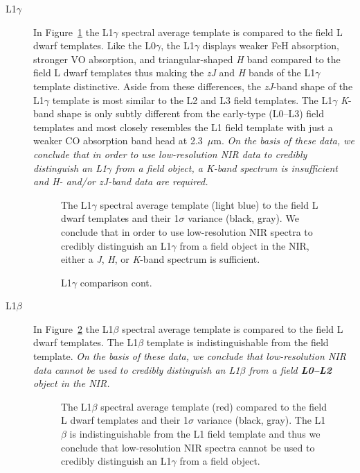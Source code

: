 \documentclass[12pt]{aastex6}
\begin{document}
\begin{description}
\item[L1$\gamma$]{
In Figure~\ref{fig:L1lg-field} the L1$\gamma$ spectral average template is compared to the field L dwarf templates.
Like the L0$\gamma$, the L1$\gamma$ displays weaker FeH absorption, stronger VO absorption, and triangular-shaped \emph{H} band compared to the field L dwarf templates thus making the \emph{zJ} and \emph{H} bands of the L1$\gamma$ template distinctive.
Aside from these differences, the \emph{zJ}-band shape of the L1$\gamma$ template is most similar to the L2 and L3 field templates.
The L1$\gamma$ \emph{K}-band shape is only subtly different from the early-type (L0--L3) field templates and most closely resembles the L1 field template with just a weaker CO absorption band head at 2.3~$\mu$m.
\emph{On the basis of these data, we conclude that in order to use low-resolution NIR data to credibly distinguish an L1$\gamma$ from a field object, a \emph{K}-band spectrum is insufficient and \emph{H}- and/or \emph{zJ}-band data are required.}
}

\begin{figure}[b]
    \caption{The L1$\gamma$ spectral average template (light blue) to the field L dwarf templates and their 1$\sigma$ variance (black, gray). We conclude that in order to use low-resolution NIR spectra to credibly distinguish an L1$\gamma$ from a field object in the NIR, either a \emph{J}, \emph{H}, or \emph{K}-band spectrum is sufficient.}
    \label{fig:L1lg-field}
\end{figure}

\begin{figure}
  \caption{L1$\gamma$ comparison cont.}
\end{figure}
\clearpage

\item[L1$\beta$]{
In Figure~\ref{fig:L1b-field} the L1$\beta$ spectral average template is compared to the field L dwarf templates.
The L1$\beta$ template is indistinguishable from the field template.
\emph{On the basis of these data, we conclude that low-resolution NIR data cannot be used to credibly distinguish an L1$\beta$ from a field \textbf{L0--L2} object in the NIR.}}

\begin{figure}[b]
    \caption{The L1$\beta$ spectral average template (red) compared to the field L dwarf templates and their 1$\sigma$ variance (black, gray). The L1$\beta$ is indistinguishable from the L1 field template and thus we conclude that low-resolution NIR spectra cannot be used to credibly distinguish an L1$\gamma$ from a field object.}
    \label{fig:L1b-field}
\end{figure}
\clearpage


\end{description}
\end{document}
